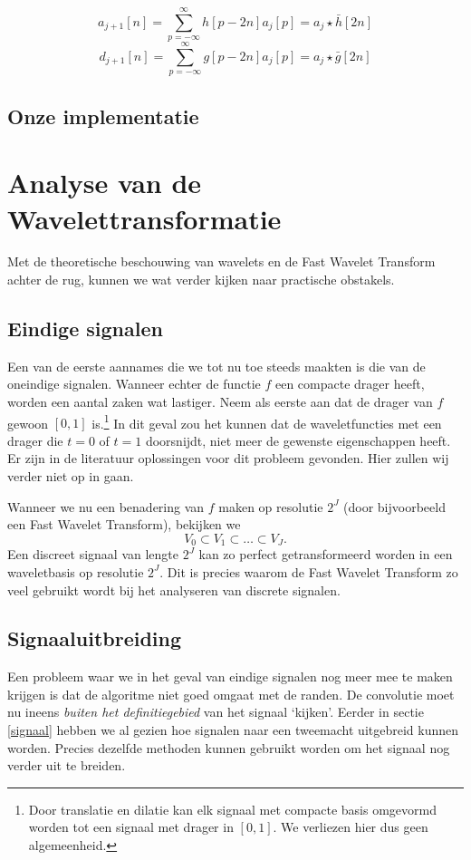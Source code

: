 \documentclass[11pt]{report}
\theoremstyle{plain}
\theoremstyle{remark}
\begin{document}
\begin{equation}
\label{approx}
	a_{j+1}[n] = \sum_{p=-\infty}^\infty h[p-2n] a_j[p] = a_j \star \bar{h}[2n]
\end{equation}
\begin{equation}
\label{detail}
	d_{j+1}[n] = \sum_{p=-\infty}^\infty g[p-2n] a_j[p] = a_j \star \bar{g}[2n]
\end{equation}

\subsection{Onze implementatie}

\section{Analyse van de Wavelettransformatie}
Met de theoretische beschouwing van wavelets en de Fast Wavelet Transform achter de rug, kunnen we wat verder kijken naar practische obstakels.

\subsection{Eindige signalen} 
Een van de eerste aannames die we tot nu toe steeds maakten is die van de oneindige signalen. Wanneer echter de functie $f$ een compacte drager heeft, worden een aantal zaken wat lastiger. Neem als eerste aan dat de drager van $f$ gewoon $[0,1]$ is.\footnote{Door translatie en dilatie kan elk signaal met compacte basis omgevormd worden tot een signaal met drager in $[0,1]$. We verliezen hier dus geen algemeenheid.} In dit geval zou het kunnen dat de waveletfuncties met een drager die $t=0$ of $t=1$ doorsnijdt, niet meer de gewenste eigenschappen heeft. Er zijn in de literatuur oplossingen voor dit probleem gevonden. Hier zullen wij verder niet op in gaan.

Wanneer we nu een benadering van $f$ maken op resolutie $2^J$ (door bijvoorbeeld een Fast Wavelet Transform), bekijken we
\[
	V_0 \subset V_{1} \subset \ldots \subset V_{J}.
\]
Een discreet signaal van lengte $2^{J}$ kan zo perfect getransformeerd worden in een waveletbasis op resolutie $2^{J}$. Dit is precies waarom de Fast Wavelet Transform zo veel gebruikt wordt bij het analyseren van discrete signalen.

\subsection{Signaaluitbreiding}
Een probleem waar we in het geval van eindige signalen nog meer mee te maken krijgen is dat de algoritme niet goed omgaat met de randen. De convolutie moet nu ineens \emph{buiten het definitiegebied} van het signaal `kijken'. Eerder in sectie \ref{signaal} hebben we al gezien hoe signalen naar een tweemacht uitgebreid kunnen worden. Precies dezelfde methoden kunnen gebruikt worden om het signaal nog verder uit te breiden. 
\end{document}
